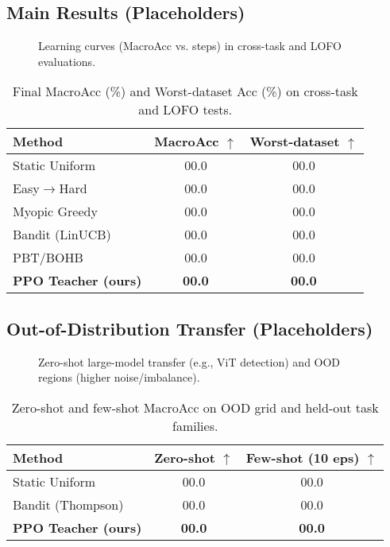 \documentclass[11pt]{article}
\newcommand{\1}{\mathbf{1}}
\begin{document}
\subsection{Main Results (Placeholders)}
\begin{figure}[H]
  \centering
  \fbox{\rule{0pt}{2in}\rule{0.95\linewidth}{0pt}}
  \caption{Learning curves (MacroAcc vs. steps) in cross-task and LOFO evaluations.}
  \label{fig:indist}
\end{figure}

\begin{table}[H]
\centering
\caption{Final MacroAcc (\%) and Worst-dataset Acc (\%) on cross-task and LOFO tests.}
\label{tab:indist}
\begin{tabular}{lcc}
\toprule
Method & MacroAcc $\uparrow$ & Worst-dataset $\uparrow$ \\
\midrule
Static Uniform & 00.0 & 00.0 \\
Easy$\to$Hard & 00.0 & 00.0 \\
Myopic Greedy & 00.0 & 00.0 \\
Bandit (LinUCB) & 00.0 & 00.0 \\
PBT/BOHB & 00.0 & 00.0 \\
\textbf{PPO Teacher (ours)} & \textbf{00.0} & \textbf{00.0} \\
\bottomrule
\end{tabular}
\end{table}

\subsection{Out-of-Distribution Transfer (Placeholders)}
\begin{figure}[H]
  \centering
  \fbox{\rule{0pt}{2in}\rule{0.95\linewidth}{0pt}}
  \caption{Zero-shot large-model transfer (e.g., ViT detection) and OOD regions (higher noise/imbalance).}
  \label{fig:ood}
\end{figure}

\begin{table}[H]
\centering
\caption{Zero-shot and few-shot MacroAcc on OOD grid and held-out task families.}
\label{tab:ood}
\begin{tabular}{lcc}
\toprule
Method & Zero-shot $\uparrow$ & Few-shot (10 eps) $\uparrow$ \\
\midrule
Static Uniform & 00.0 & 00.0 \\
Bandit (Thompson) & 00.0 & 00.0 \\
\textbf{PPO Teacher (ours)} & \textbf{00.0} & \textbf{00.0} \\
\bottomrule
\end{tabular}
\end{table}
\end{document}

